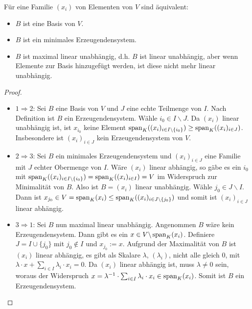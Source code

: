 \begin{proposition}
	Für eine Familie $(x_i)$ von Elementen von $V$ sind äquivalent:
	\begin{itemize}
		\item $B$ ist eine Basis von $V$.
		\item $B$ ist ein minimales Erzeugendensystem.
		\item $B$ ist maximal linear unabhängig, d.h. $B$ ist linear unabhängig, aber wenn Elemente zur Basis 
		hinzugefügt werden, ist diese nicht mehr linear unabhängig.
	\end{itemize}
\end{proposition}
\begin{proof}
	\begin{itemize}
		\item $1 \Rightarrow 2$: Sei $B$ eine Basis von $V$ und $J$ eine echte Teilmenge von $I$. Nach Definition ist $B$ ein 
		Erzeugendensystem. Wähle $i_0 \in I\backslash J$. Da $(x_i)$ linear unabhängig ist, ist $x_{i_0}$ keine Element 
		$\operatorname{span}_K((x_i)_{i \in I\backslash \{i_0\}}) \ge \operatorname{span}_K((x_i)_{i \in J})$. Insbesondere ist $(x_i)_{i\in J}$ kein 
		Erzeugendensystem von $V$. 
		\item $2 \Rightarrow 3$: Sei $B$ ein minimales Erzeugendensystem und $(x_i)_{i \in J}$ eine Familie mit $J$ echter 
		Obermenge von $I$. Wäre $(x_i)$ linear abhängig, so gäbe es ein $i_0$ mit $\operatorname{span}_K((x_i)_{i \in I\backslash 
			\{i_0\}}) = \operatorname{span}_K((x_i)_{i \in I})=V$ im Widerspruch zur Minimalität von $B$. Also ist $B=(x_i)$ linear 
		unabhängig. Wähle $j_0 \in J\backslash I$. Dann ist $x_{j_0} \in V=\operatorname{span}_K(x_i) \le \operatorname{span}_K((x_i)_{i \in 
			J\backslash \{j_0\}})$ und somit ist $(x_i)_{i\in J}$ linear abhängig.
		\item $3 \Rightarrow 1$: Sei $B$ nun maximal linear unabhängig. Angenommen $B$ wäre kein Erzeugendensystem. 
		Dann gibt es ein $x\in V \backslash \operatorname{span}_K(x_i)$. Definiere $J=I \cup \{j_0\}$ mit $j_0 \notin I$ und $x_{j_0}:=x$. 
		Aufgrund der Maximalität von $B$ ist $(x_i)$ linear abhängig, es gibt als Skalare $\lambda$, $(\lambda_i)$, nicht 
		alle gleich 0, mit $\lambda\cdot x+\sum_{i \in I} \lambda_i\cdot x_i=0$. Da $(x_i)$ linear abhängig ist, 
		muss $\lambda \neq 0$ sein, woraus der Widerspruch $x=\lambda^{-1}\cdot\sum_{i \in I} \lambda_i\cdot x_i 
		\in \operatorname{span}_K(x_i)$. Somit ist $B$ ein Erzeugendensystem.
	\end{itemize}
\end{proof}

